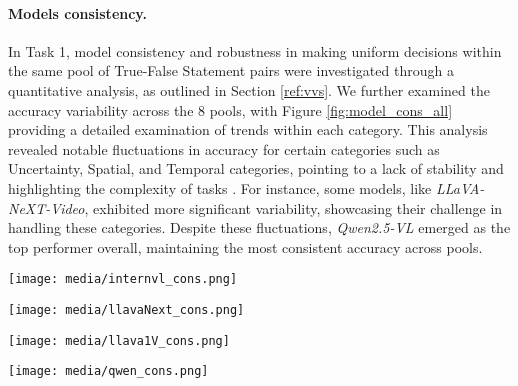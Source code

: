 \paragraph{Models consistency.}
In Task 1, model consistency and robustness in making uniform decisions within the same pool of True-False Statement pairs were investigated through a quantitative analysis, as outlined in Section \ref{ref:vvs}. We further examined the accuracy variability across the 8 pools, with Figure \ref{fig:model_cons_all} providing a detailed examination of trends within each category. This analysis revealed notable fluctuations in accuracy for certain categories such as Uncertainty, Spatial, and Temporal categories, pointing to a lack of stability and highlighting the complexity of tasks . For instance, some models, like \textit{LLaVA-NeXT-Video}, exhibited more significant variability, showcasing their challenge in handling these categories. Despite these fluctuations, \textit{Qwen2.5-VL} emerged as the top performer overall, maintaining the most consistent accuracy across pools.
\begin{figure*}[t]
  \centering
  \begin{minipage}[b]{0.48\textwidth}
    \centering
    \texttt{[image: media/internvl\_cons.png]}
  \end{minipage}\hfill
  \begin{minipage}[b]{0.48\textwidth}
    \centering
    \texttt{[image: media/llavaNext\_cons.png]}
  \end{minipage}
  
  \vspace{1em} %
  
  \begin{minipage}[b]{0.48\textwidth}
    \centering
    \texttt{[image: media/llava1V\_cons.png]}
  \end{minipage}\hfill
  \begin{minipage}[b]{0.48\textwidth}
    \centering
    \texttt{[image: media/qwen\_cons.png]}
  \end{minipage}
  
  \caption{Performance trends of the four models. Each plot shows the accuracy trend as a function of the 8 different pools.}
  \label{fig:model_cons_all}
\end{figure*}












